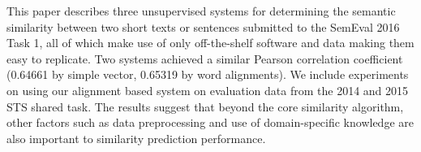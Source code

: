 This paper describes three unsupervised systems for determining the semantic similarity between two short texts or sentences submitted to the SemEval 2016 Task 1, all of which make use of only off-the-shelf software and data making them easy to replicate. Two systems achieved a similar Pearson correlation coefficient (0.64661 by simple vector, 0.65319 by word alignments). We include experiments on using our alignment based system on evaluation data from the 2014 and 2015 STS shared task. The results suggest that beyond the core similarity algorithm, other factors such as data preprocessing and use of domain-specific knowledge are also important to similarity prediction performance.
